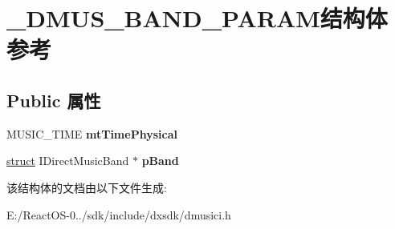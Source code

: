 \hypertarget{struct___d_m_u_s___b_a_n_d___p_a_r_a_m}{}\section{\+\_\+\+D\+M\+U\+S\+\_\+\+B\+A\+N\+D\+\_\+\+P\+A\+R\+A\+M结构体 参考}
\label{struct___d_m_u_s___b_a_n_d___p_a_r_a_m}
\subsection*{Public 属性}
\begin{DoxyCompactItemize}
\item 
\mbox{\label{struct___d_m_u_s___b_a_n_d___p_a_r_a_m_a10262fb213b10fecfd113e71ff723dae}} 
M\+U\+S\+I\+C\+\_\+\+T\+I\+ME {\bfseries mt\+Time\+Physical}
\item 
\mbox{\label{struct___d_m_u_s___b_a_n_d___p_a_r_a_m_a94d5effe6a53e58211417bfc059f4247}} 
\hyperlink{interfacestruct}{struct} I\+Direct\+Music\+Band $\ast$ {\bfseries p\+Band}
\end{DoxyCompactItemize}


该结构体的文档由以下文件生成\+:\begin{DoxyCompactItemize}
\item 
E\+:/\+React\+O\+S-\/0../sdk/include/dxsdk/dmusici.\+h\end{DoxyCompactItemize}
